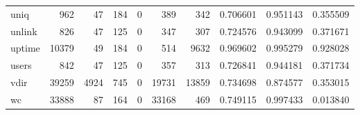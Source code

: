 \begin{longtable}{lrrrrrrrrr}
uniq      &                                 962 &                                              47 &                                            184 &                                             0 &                                            389 &                                          342 &                                           0.706601 &                               0.951143 &                             0.355509 \\
unlink    &                                 826 &                                              47 &                                            125 &                                             0 &                                            347 &                                          307 &                                           0.724576 &                               0.943099 &                             0.371671 \\
uptime    &                               10379 &                                              49 &                                            184 &                                             0 &                                            514 &                                         9632 &                                           0.969602 &                               0.995279 &                             0.928028 \\
users     &                                 842 &                                              47 &                                            125 &                                             0 &                                            357 &                                          313 &                                           0.726841 &                               0.944181 &                             0.371734 \\
vdir      &                               39259 &                                            4924 &                                            745 &                                             0 &                                          19731 &                                        13859 &                                           0.734698 &                               0.874577 &                             0.353015 \\
wc        &                               33888 &                                              87 &                                            164 &                                             0 &                                          33168 &                                          469 &                                           0.749115 &                               0.997433 &                             0.013840 \\

\end{longtable}
